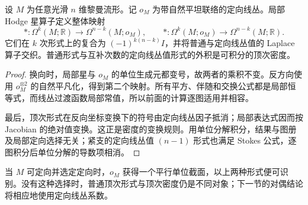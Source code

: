 \begin{proposition}\label{g3:prop:twisted-hodge-star}
	设 \(M\) 为任意光滑 \(n\) 维黎曼流形。记 \(o_M\) 为带自然平坦联络的定向线丛。局部 Hodge 星算子定义整体映射
	\[
		*:\Omega^k(M;\mathbb R)\longrightarrow\Omega^{n-k}(M;o_M),
		\qquad
		*:\Omega^k(M;o_M)\longrightarrow\Omega^{n-k}(M;\mathbb R).
	\]
	它们在 \(k\) 次形式上的复合为 \((-1)^{k(n-k)}I\)，并将普通与定向线丛值的 Laplace 算子交织。普通形式与互补次数的定向线丛值形式的外积是可积分的顶次密度。
\end{proposition}
\begin{proof}
	换向时，局部星与 \(o_M\) 的单位生成元都变号，故两者的乘积不变。反方向使用 \(o_M^{\otimes2}\) 的自然平凡化，得到第二个映射。所有平方、伴随和交换公式都是局部恒等式，而线丛过渡函数局部常值，所以前面的计算逐图适用并相容。

	最后，顶次形式在反向坐标变换下的符号由定向线丛因子抵消；局部表达式因而按 Jacobian 的绝对值变换。这正是密度的变换规则。用单位分解积分，结果与图册及局部定向选择无关；紧支的定向线丛值 \((n-1)\) 形式也满足 Stokes 公式，逐图积分后单位分解的导数项相消。
\end{proof}

当 \(M\) 可定向并选定定向时，\(o_M\) 获得一个平行单位截面，以上两种形式便可识别。没有这种选择时，普通顶次形式与顶次密度仍是不同对象；下一节的对偶结论将相应地使用定向线丛系数。
